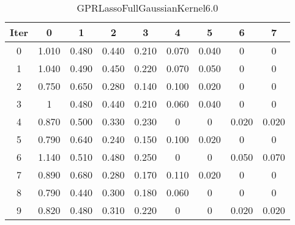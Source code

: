 \begin{table}
	\begin{center}
		\begin{tabular}{|c|c|c|c|c|c|c|c|c|}
			\hline
			Iter & 0 & 1 & 2 & 3 & 4 & 5 & 6 & 7 \\
			\hline
			0 & 1.010 & 0.480 & 0.440 & 0.210 & 0.070 & 0.040 & 0 & 0 \\
			\hline
			1 & 1.040 & 0.490 & 0.450 & 0.220 & 0.070 & 0.050 & 0 & 0 \\
			\hline
			2 & 0.750 & 0.650 & 0.280 & 0.140 & 0.100 & 0.020 & 0 & 0 \\
			\hline
			3 & 1 & 0.480 & 0.440 & 0.210 & 0.060 & 0.040 & 0 & 0 \\
			\hline
			4 & 0.870 & 0.500 & 0.330 & 0.230 & 0 & 0 & 0.020 & 0.020 \\
			\hline
			5 & 0.790 & 0.640 & 0.240 & 0.150 & 0.100 & 0.020 & 0 & 0 \\
			\hline
			6 & 1.140 & 0.510 & 0.480 & 0.250 & 0 & 0 & 0.050 & 0.070 \\
			\hline
			7 & 0.890 & 0.680 & 0.280 & 0.170 & 0.110 & 0.020 & 0 & 0 \\
			\hline
			8 & 0.790 & 0.440 & 0.300 & 0.180 & 0.060 & 0 & 0 & 0 \\
			\hline
			9 & 0.820 & 0.480 & 0.310 & 0.220 & 0 & 0 & 0.020 & 0.020 \\
			\hline
		\end{tabular}
	\end{center}
	\caption{GPRLassoFullGaussianKernel6.0}
\end{table}